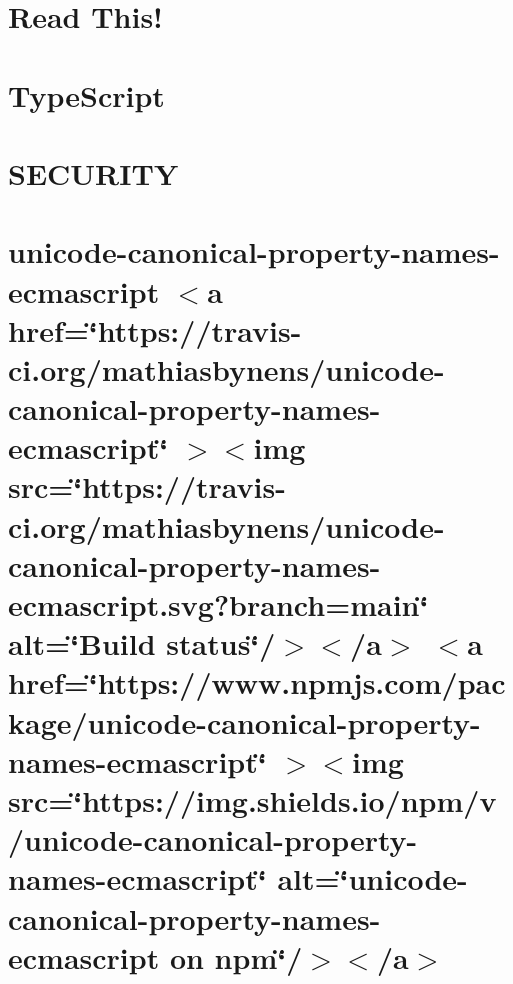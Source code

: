 \documentclass[twoside]{book}
\newcommand{\+}{\discretionary{\mbox{\scriptsize$\hookleftarrow$}}{}{}}
\begin{document}
\chapter{Read This!}
\label{md__c___users_vaishnavi_jadhav__desktop__developer_code_mean_stack_example_client_node_modules_typescript_lib__r_e_a_d_m_e}

\chapter{Type\+Script}
\label{md__c___users_vaishnavi_jadhav__desktop__developer_code_mean_stack_example_client_node_modules_typescript__r_e_a_d_m_e}

\chapter{SECURITY}
\label{md__c___users_vaishnavi_jadhav__desktop__developer_code_mean_stack_example_client_node_modules_typescript__s_e_c_u_r_i_t_y}

\chapter{unicode-\/canonical-\/property-\/names-\/ecmascript \texorpdfstring{$<$}{<}a href=\char`\"{}https\+://travis-\/ci.\+org/mathiasbynens/unicode-\/canonical-\/property-\/names-\/ecmascript\char`\"{} \texorpdfstring{$>$}{>}\texorpdfstring{$<$}{<}img src=\char`\"{}https\+://travis-\/ci.\+org/mathiasbynens/unicode-\/canonical-\/property-\/names-\/ecmascript.\+svg?branch=main\char`\"{} alt=\char`\"{}\+Build status\char`\"{}/\texorpdfstring{$>$}{>}\texorpdfstring{$<$}{<}/a\texorpdfstring{$>$}{>} \texorpdfstring{$<$}{<}a href=\char`\"{}https\+://www.\+npmjs.\+com/package/unicode-\/canonical-\/property-\/names-\/ecmascript\char`\"{} \texorpdfstring{$>$}{>}\texorpdfstring{$<$}{<}img src=\char`\"{}https\+://img.\+shields.\+io/npm/v/unicode-\/canonical-\/property-\/names-\/ecmascript\char`\"{} alt=\char`\"{}unicode-\/canonical-\/property-\/names-\/ecmascript on npm\char`\"{}/\texorpdfstring{$>$}{>}\texorpdfstring{$<$}{<}/a\texorpdfstring{$>$}{>}}
\label{md__c___users_vaishnavi_jadhav__desktop__developer_code_mean_stack_example_client_node_modules_udc7cd2157b73ab0032530ac6b909efbb}

\end{document}

